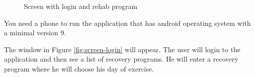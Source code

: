 \begin{figure}[!htb]
  \centering
  \hfill
    
    \caption{Screen with login and rehab program}
\end{figure}

You need a phone to run the application that has 
android operating system with a minimal version 9.

The window in Figure \ref{fig:screen-login} will appear.
The user will login to the application and then see a list of recovery programs.
He will enter a recovery program where he will choose his day of exercise.

